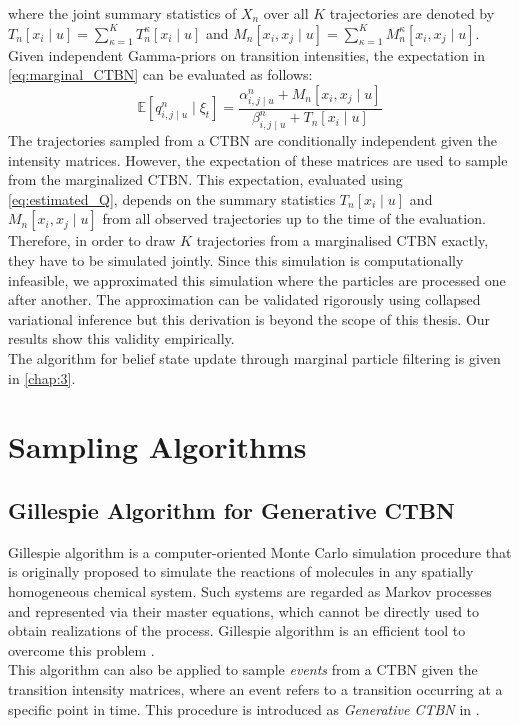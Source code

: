 where the joint summary statistics of $ X_n $ over all $ K $ trajectories are denoted by  $ T_{n}[x_i\mid u] = \sum_{\kappa=1}^{K} T_{n}^\kappa[x_i\mid u] $ and $ M_{n}[x_i, x_j\mid u] =\sum_{\kappa=1}^{K} M_{n}^\kappa[x_i, x_j\mid u]$.\\
Given independent Gamma-priors on transition intensities, the expectation in \autoref{eq:marginal_CTBN} can be evaluated as follows:
\begin{equation}
\mathbb{E}\left[q_{i,j\mid u}^{n} \mid \xi_{t}\right]=\frac{\alpha^n_{i,j\mid u}+M_{n}[x_i, x_j\mid u]}{\beta^n_{i,j\mid u}+T_{n}[x_i \mid u]}
\label{eq:estimated_Q}
\end{equation}
The trajectories sampled from a CTBN are conditionally independent given the intensity matrices. However, the expectation of these matrices are used to sample from the marginalized CTBN. This expectation, evaluated using \autoref{eq:estimated_Q}, depends on the summary statistics $T_{n}[x_i\mid u]$ and $M_{n}[x_i, x_j\mid u]$ from all observed trajectories up to the time of the evaluation. Therefore, in order to draw $K$ trajectories from a marginalised CTBN exactly, they have to be simulated jointly. Since this simulation is computationally infeasible, we approximated this simulation where the particles are processed one after another. The approximation can be validated rigorously using collapsed variational inference but this derivation is beyond the scope of this thesis. Our results show this validity empirically. \\
The algorithm for belief state update through marginal particle filtering is given in \cref{chap:3}. 

\section{Sampling Algorithms}
\label{sec:sampling_alg}
\subsection{Gillespie Algorithm for Generative CTBN}
Gillespie algorithm is a computer-oriented Monte Carlo simulation procedure that is originally proposed to simulate the reactions of molecules in any spatially homogeneous chemical system. Such systems are regarded as Markov processes and represented via their master equations, which cannot be directly used to obtain realizations of the process. Gillespie algorithm is an efficient tool to overcome this problem \cite{Gillespie1976}.\\
This algorithm can also be applied to sample \textit{events} from a CTBN given the transition intensity matrices, where an event refers to a transition occurring at a specific point in time. This procedure is introduced as \textit{Generative CTBN} in \cite{Nodelman1995}.


